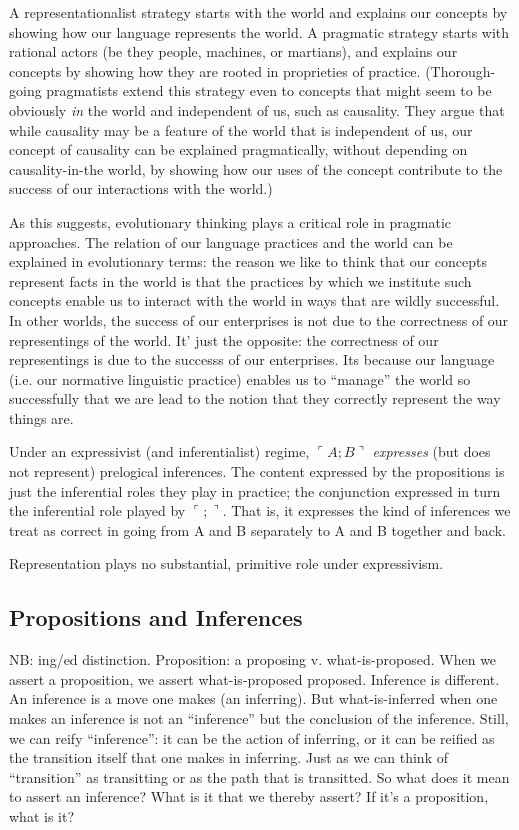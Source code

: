 \documentclass{article}
\begin{document}
A representationalist strategy starts with the world and explains our
concepts by showing how our language represents the world. A pragmatic
strategy starts with rational actors (be they people, machines, or
martians), and explains our concepts by showing how they are rooted in
proprieties of practice. (Thorough-going pragmatists extend this
strategy even to concepts that might seem to be obviously \textit{in}
the world and independent of us, such as causality. They argue that
while causality may be a feature of the world that is independent of
us, our concept of causality can be explained pragmatically, without
depending on causality-in-the world, by showing how our uses of the
concept contribute to the success of our interactions with the world.)

As this suggests, evolutionary thinking plays a critical role in
pragmatic approaches. The relation of our language practices and the
world can be explained in evolutionary terms: the reason we like to
think that our concepts represent facts in the world is that the
practices by which we institute such concepts enable us to interact
with the world in ways that are wildly successful. In other worlds,
the success of our enterprises is not due to the correctness of our
representings of the world. It' just the opposite: the correctness of
our representings is due to the successs of our enterprises. Its
because our language (i.e. our normative linguistic practice) enables
us to ``manage'' the world so successfully that we are lead to the
notion that they correctly represent the way things are.

Under an expressivist (and inferentialist) regime, \(\ulcorner A ;
B\urcorner\) \textit{expresses} (but does not represent) prelogical
inferences. The content expressed by the propositions is just the
inferential roles they play in practice; the conjunction expressed in
turn the inferential role played by \(\ulcorner ; \urcorner\). That
is, it expresses the kind of inferences we treat as correct in going
from A and B separately to A and B together and back.

Representation plays no substantial, primitive role under
expressivism.

\subsection{Propositions and Inferences}

NB: ing/ed distinction. Proposition: a proposing v. what-is-proposed.
When we assert a proposition, we assert what-is-proposed proposed.
Inference is different. An inference is a move one makes (an
inferring). But what-is-inferred when one makes an inference is not an
``inference'' but the conclusion of the inference. Still, we can reify
``inference'': it can be the action of inferring, or it can be reified
as the transition itself that one makes in inferring. Just as we can
think of ``transition'' as transitting or as the path that is
transitted. So what does it mean to assert an inference? What is it
that we thereby assert? If it's a proposition, what is it?
\end{document}
